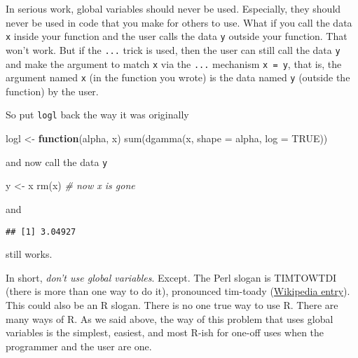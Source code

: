 \documentclass[
]{article}
\newenvironment{Shaded}{\begin{snugshade}}{\end{snugshade}}
\newcommand{\AttributeTok}[1]{\textcolor[rgb]{0.77,0.63,0.00}{#1}}
\newcommand{\CommentTok}[1]{\textcolor[rgb]{0.56,0.35,0.01}{\textit{#1}}}
\newcommand{\ConstantTok}[1]{\textcolor[rgb]{0.00,0.00,0.00}{#1}}
\newcommand{\ControlFlowTok}[1]{\textcolor[rgb]{0.13,0.29,0.53}{\textbf{#1}}}
\newcommand{\FunctionTok}[1]{\textcolor[rgb]{0.00,0.00,0.00}{#1}}
\newcommand{\NormalTok}[1]{#1}
\newcommand{\OtherTok}[1]{\textcolor[rgb]{0.56,0.35,0.01}{#1}}
\newcommand{\SpecialCharTok}[1]{\textcolor[rgb]{0.00,0.00,0.00}{#1}}
\begin{document}
In serious work, global variables should never be used. Especially, they
should never be used in code that you make for others to use. What if
you call the data \texttt{x} inside your function and the user calls the
data \texttt{y} outside your function. That won't work. But if the
\texttt{...} trick is used, then the user can still call the data
\texttt{y} and make the argument to match \texttt{x} via the
\texttt{...} mechanism \texttt{x\ =\ y}, that is, the argument named
\texttt{x} (in the function you wrote) is the data named \texttt{y}
(outside the function) by the user.

So put \texttt{logl} back the way it was originally

\begin{Shaded}
\begin{Highlighting}[]
\NormalTok{logl }\OtherTok{\textless{}{-}} \ControlFlowTok{function}\NormalTok{(alpha, x)}
    \FunctionTok{sum}\NormalTok{(}\FunctionTok{dgamma}\NormalTok{(x, }\AttributeTok{shape =}\NormalTok{ alpha, }\AttributeTok{log =} \ConstantTok{TRUE}\NormalTok{))}
\end{Highlighting}
\end{Shaded}

and now call the data \texttt{y}

\begin{Shaded}
\begin{Highlighting}[]
\NormalTok{y }\OtherTok{\textless{}{-}}\NormalTok{ x}
\FunctionTok{rm}\NormalTok{(x) }\CommentTok{\# now x is gone}
\end{Highlighting}
\end{Shaded}

and

\begin{Shaded}
\end{Shaded}

\begin{verbatim}
## [1] 3.04927
\end{verbatim}

still works.

In short, \emph{don't use global variables}. Except. The Perl slogan is
TIMTOWTDI (there is more than one way to do it), pronounced tim-toady
(\href{https://en.wikipedia.org/w/index.php?title=There\%27s_more_than_one_way_to_do_it\&oldid=754047450}{Wikipedia
entry}). This could also be an R slogan. There is no one true way to use
R. There are many ways of R. As we said above, the way of this problem
that uses global variables is the simplest, easiest, and most R-ish for
one-off uses when the programmer and the user are one.
\end{document}

